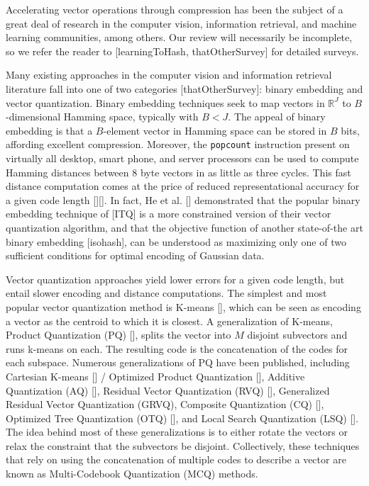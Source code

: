 
Accelerating vector operations through compression has been the subject of a great deal of research in the computer vision, information retrieval, and machine learning communities, among others. Our review will necessarily be incomplete, so we refer the reader to [learningToHash, thatOtherSurvey] for detailed surveys. %

Many existing approaches in the computer vision and information retrieval literature fall into one of two categories [thatOtherSurvey]: binary embedding and vector quantization. Binary embedding techniques seek to map vectors in $\mathbb{R}^J$ to $B$-dimensional Hamming space, typically with $B < J$. The appeal of binary embedding is that a $B$-element vector in Hamming space can be stored in $B$ bits, affording excellent compression. Moreover, the \texttt{popcount} instruction present on virtually all desktop, smart phone, and server processors can be used to compute Hamming distances between 8 byte vectors in as little as three cycles. This fast distance computation comes at the price of reduced representational accuracy for a given code length [][]. In fact, He et al. [] demonstrated that the popular binary embedding technique of [ITQ] is a more constrained version of their vector quantization algorithm, and that the objective function of another state-of-the art binary embedding [isohash], can be understood as maximizing only one of two sufficient conditions for optimal encoding of Gaussian data.

Vector quantization approaches yield lower errors for a given code length, but entail slower encoding and distance computations. The simplest and most popular vector quantization method is K-means [], which can be seen as encoding a vector as the centroid to which it is closest. A generalization of K-means, Product Quantization (PQ) [], splits the vector into $M$ disjoint subvectors and runs k-means on each. The resulting code is the concatenation of the codes for each subspace. Numerous generalizations of PQ have been published, including Cartesian K-means [] / Optimized Product Quantization [], Additive Quantization (AQ) [], Residual Vector Quantization (RVQ) [], Generalized Residual Vector Quantization (GRVQ), Composite Quantization (CQ) [], Optimized Tree Quantization (OTQ) [], and Local Search Quantization (LSQ) []. The idea behind most of these generalizations is to either rotate the vectors or relax the constraint that the subvectors be disjoint. Collectively, these techniques that rely on using the concatenation of multiple codes to describe a vector are known as Multi-Codebook Quantization (MCQ) methods.


